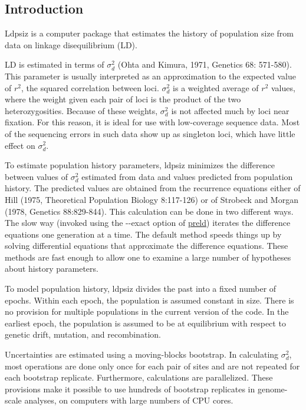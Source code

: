 \subsection*{Introduction}

Ldpsiz is a computer package that estimates the history of population size from data on linkage disequilibrium (L\+D).

L\+D is estimated in terms of $\sigma_d^2$ (Ohta and Kimura, 1971, Genetics 68\+: 571-\/580). This parameter is usually interpreted as an approximation to the expected value of $r^2$, the squared correlation between loci. $\sigma_d^2$ is a weighted average of $r^2$ values, where the weight given each pair of loci is the product of the two heterozygosities. Because of these weights, $\sigma_d^2$ is not affected much by loci near fixation. For this reason, it is ideal for use with low-\/coverage sequence data. Most of the sequencing errors in such data show up as singleton loci, which have little effect on $\sigma_d^2$.

To estimate population history parameters, {\ttfamily ldpsiz} minimizes the difference between values of $\sigma_d^2$ estimated from data and values predicted from population history. The predicted values are obtained from the recurrence equations either of Hill (1975, Theoretical Population Biology 8\+:117-\/126) or of Strobeck and Morgan (1978, Genetics 88\+:829-\/844). This calculation can be done in two different ways. The slow way (invoked using the {\ttfamily -\/-\/exact} option of \hyperlink{preld_8c_preld}{preld}) iterates the difference equations one generation at a time. The default method speeds things up by solving differential equations that approximate the difference equations. These methods are fast enough to allow one to examine a large number of hypotheses about history parameters.

To model population history, {\ttfamily ldpsiz} divides the past into a fixed number of epochs. Within each epoch, the population is assumed constant in size. There is no provision for multiple populations in the current version of the code. In the earliest epoch, the population is assumed to be at equilibrium with respect to genetic drift, mutation, and recombination.

Uncertainties are estimated using a moving-\/blocks bootstrap. In calculating $\sigma_d^2$, most operations are done only once for each pair of sites and are not repeated for each bootstrap replicate. Furthermore, calculations are parallelized. These provisions make it possible to use hundreds of bootstrap replicates in genome-\/scale analyses, on computers with large numbers of C\+P\+U cores.

